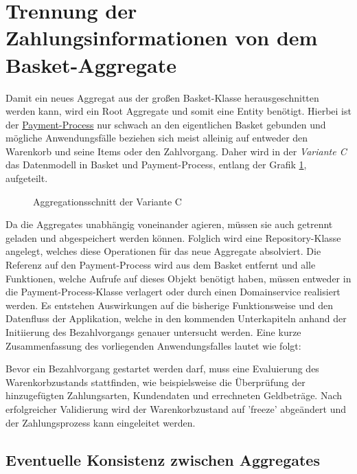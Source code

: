 \section{Trennung der Zahlungsinformationen von dem Basket-Aggregate}

Damit ein neues Aggregat aus der großen Basket-Klasse herausgeschnitten werden kann, wird ein Root Aggregate und somit eine Entity benötigt. Hierbei ist der \ul{Payment-Process} nur schwach an den eigentlichen Basket gebunden und mögliche Anwendungsfälle beziehen sich meist alleinig auf entweder den Warenkorb und seine Items oder den Zahlvorgang. Daher wird in der \emph{Variante C} das Datenmodell in Basket und Payment-Process, entlang der Grafik \ref{fig:VarC}, aufgeteilt. 

\begin{figure}[htbp]
	\centering
	
	\caption{Aggregationsschnitt der Variante C}
	\label{fig:VarC}
\end{figure}

Da die Aggregates unabhängig voneinander agieren, müssen sie auch getrennt geladen und abgespeichert werden können. Folglich wird eine Repository-Klasse angelegt, welches diese Operationen für das neue Aggregate absolviert. Die Referenz auf den Payment-Process wird aus dem Basket entfernt und alle Funktionen, welche Aufrufe auf dieses Objekt benötigt haben, müssen entweder in die Payment-Process-Klasse verlagert oder durch einen Domainservice realisiert werden. Es entstehen Auswirkungen auf die bisherige Funktionsweise und den Datenfluss der Applikation, welche in den kommenden Unterkapiteln anhand der Initiierung des Bezahlvorgangs genauer untersucht werden. Eine kurze Zusammenfassung des vorliegenden Anwendungsfalles lautet wie folgt:
 
Bevor ein Bezahlvorgang gestartet werden darf, muss eine Evaluierung des Warenkorbzustands stattfinden, wie beispielsweise die Überprüfung der hinzugefügten Zahlungsarten, Kundendaten und errechneten Geldbeträge. Nach erfolgreicher Validierung wird der Warenkorbzustand auf 'freeze' abgeändert und der Zahlungsprozess kann eingeleitet werden.

\subsection{Eventuelle Konsistenz zwischen Aggregates}

